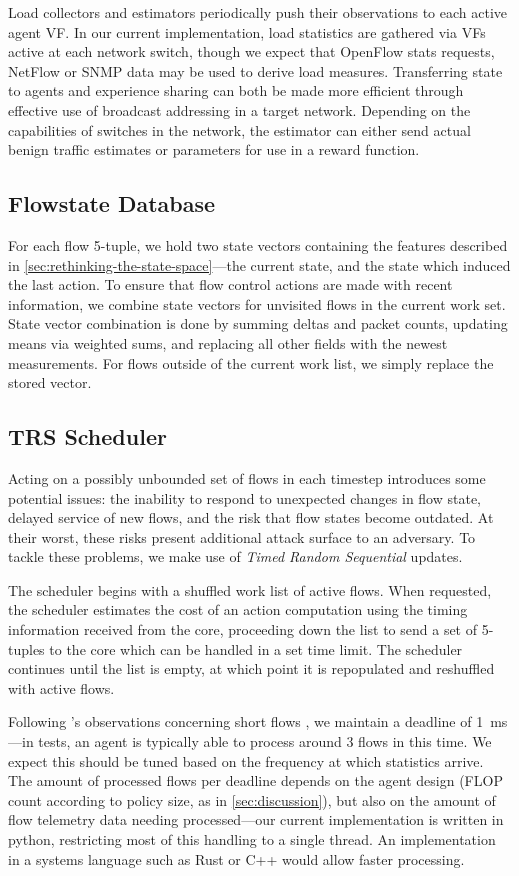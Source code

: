 \documentclass[10pt, times, conference, letterpaper]{IEEEtran}
\begin{document}
Load collectors and estimators periodically push their observations to each active agent VF.
In our current implementation, load statistics are gathered via VFs active at each network switch, though we expect that OpenFlow stats requests, NetFlow or SNMP data may be used to derive load measures.
Transferring state to agents and experience sharing can both be made more efficient through effective use of broadcast addressing in a target network.
Depending on the capabilities of switches in the network, the estimator can either send actual benign traffic estimates or parameters for use in a reward function.

\subsection{Flowstate Database}
For each flow 5-tuple, we hold two state vectors containing the features described in \cref{sec:rethinking-the-state-space}---the current state, and the state which induced the last action.
To ensure that flow control actions are made with recent information, we combine state vectors for unvisited flows in the current work set.
State vector combination is done by summing deltas and packet counts, updating means via weighted sums, and replacing all other fields with the newest measurements.
For flows outside of the current work list, we simply replace the stored vector.

\subsection{TRS Scheduler}
Acting on a possibly unbounded set of flows in each timestep introduces some potential issues: the inability to respond to unexpected changes in flow state, delayed service of new flows, and the risk that flow states become outdated.
At their worst, these risks present additional attack surface to an adversary.
To tackle these problems, we make use of \emph{Timed Random Sequential} updates.

The scheduler begins with a shuffled work list of active flows.
When requested, the scheduler estimates the cost of an action computation using the timing information received from the core, proceeding down the list to send a set of 5-tuples to the core which can be handled in a set time limit.
The scheduler continues until the list is empty, at which point it is repopulated and reshuffled with active flows.

Following \citeauthor{DBLP:conf/sigcomm/ChenL0L18}'s observations concerning short flows \cite{DBLP:conf/sigcomm/ChenL0L18}, we maintain a deadline of \SI{1}{\milli\second}---in tests, an agent is typically able to process around 3 flows in this time.
We expect this should be tuned based on the frequency at which statistics arrive.
The amount of processed flows per deadline depends on the agent design (FLOP count according to policy size, as in \cref{sec:discussion}), but also on the amount of flow telemetry data needing processed---our current implementation is written in python, restricting most of this handling to a single thread.
An implementation in a systems language such as Rust or C++ would allow faster processing.
\end{document}
